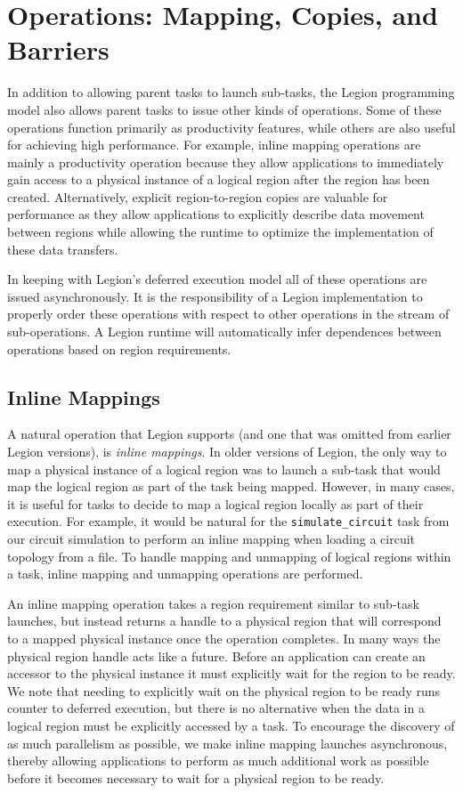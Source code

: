 \section{Operations: Mapping, Copies, and Barriers}
\label{sec:ops}
In addition to allowing parent tasks to launch 
sub-tasks, the Legion programming model also allows
parent tasks to issue other kinds of operations.
Some of these operations function primarily as 
productivity features, while others are also 
useful for achieving high performance. For example,
inline mapping operations are mainly a productivity
operation because they allow applications to 
immediately gain access to a physical instance of
a logical region after the region has been created.
Alternatively, explicit region-to-region copies
are valuable for performance as they allow 
applications to explicitly describe data movement
between regions while allowing the runtime to
optimize the implementation of these data transfers.

In keeping with Legion's deferred execution model
all of these operations are issued asynchronously.
It is the responsibility of a Legion implementation to
properly order these operations with respect to
other operations in the stream of sub-operations.
A Legion runtime will automatically infer dependences
between operations based on region requirements.

\subsection{Inline Mappings}
\label{subsec:inline}
A natural operation that Legion
supports (and one that was omitted from earlier
Legion versions), is {\em inline mappings}. In
older versions of Legion, the only way to 
map a physical instance of a logical region was
to launch a sub-task that would map the logical
region as part of the task being mapped. However,
in many cases, it is useful for tasks to decide 
to map a logical region locally as part of their
execution. For example, it would be natural for
the {\tt simulate\_circuit} task from our circuit
simulation to perform an inline mapping
when loading a circuit topology from a file.
To handle mapping and unmapping of logical regions
within a task, inline mapping and unmapping 
operations are performed.

An inline mapping operation takes a region requirement
similar to sub-task launches, but instead returns
a handle to a physical region that will 
correspond to a mapped physical instance once the
operation completes. In many ways the physical region 
handle acts like a future. Before an 
application can create an accessor to the physical 
instance it must explicitly wait for the region to be ready.
We note that needing to explicitly wait on the physical
region to be ready runs counter to
deferred execution, but there is no 
alternative when the data in a logical region must
be explicitly accessed by a task. To encourage
the discovery of as much parallelism as possible,
we make inline mapping launches asynchronous, thereby
allowing applications to perform as much additional
work as possible before it becomes necessary to wait 
for a physical region to be ready.

